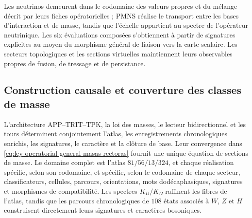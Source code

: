 

Les neutrinos demeurent dans le codomaine des valeurs propres et du mélange décrit par leurs
fiches opératorielles ; PMNS réalise le transport entre les bases d'interaction et de
masse, tandis que l'échelle appartient au spectre de l'opérateur neutrinique. Les six
évaluations composées s'obtiennent à partir de signatures explicites au moyen du morphisme
général de liaison vers la carte scalaire. Les secteurs topologiques et les sections virtuelles maintiennent leurs
observables propres de fusion, de tressage et de persistance.

\subsection{Construction causale et couverture des classes de masse}

L'architecture APP--TRIT--TPK, la loi des masses, le lecteur bidirectionnel et
les tours déterminent conjointement l'atlas, les enregistrements chronologiques
enrichis, les signatures, le caractère et la clôture de base. Leur convergence dans
\eqref{eq:ley-operatorial-general-masas-rectoras} fournit une unique
équation de sections de masse. Le domaine complet est l'atlas \(81/56/13/324\), et chaque réalisation spécifie, selon son codomaine,
et spécifie, selon le codomaine de chaque secteur, classificateurs, cellules, parcours,
orientations, mots dodécaphasiques, signatures et morphismes de compatibilité. Les
spectres \(K_D/K_\Omega\) raffinent les fibres de l'atlas, tandis que les parcours
chronologiques de \(108\) états associés à \(W\), \(Z\) et \(H\) construisent
directement leurs signatures et caractères bosoniques.
